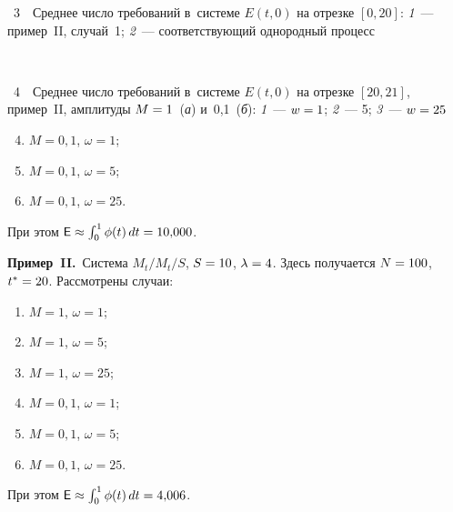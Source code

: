 \begin{multicols}{2}
{\begin{center}
\end{center}

\vspace*{-3pt}


\noindent
{{\figurename~3}\ \ \small{Среднее число требований в~системе $E(t,0)$ на
отрезке $[0,20]$: \textit{1}~--- пример~II, случай~1; \textit{2}~--- 
соответствующий однородный процесс}}

}


\vspace*{9pt}




{ \begin{center}  %
 \vspace*{-2pt}
 \mbox{%
 \epsfxsize=79mm 
 }


\end{center}

\vspace*{-5pt}


\noindent
{{\figurename~4}\ \ \small{Среднее число требований в~системе $E(t,0)$ на
отрезке $[20,21]$, пример~II, амплитуды $M\hm=1$~(\textit{а})
и~0,1~(\textit{б}):
\textit{1}~--- $w\hm=1$; \textit{2}~--- 5; \textit{3}~--- $w\hm=25$}}

}


\vspace*{10pt}




\begin{enumerate}[(1)]
\setcounter{enumi}{3}
\item  $M=0{,}1$, $\omega =1$;
\item  $M=0{,}1$, $\omega =5$;
\item  $M=0{,}1$, $\omega =25$.
\end{enumerate}
При этом $\textsf{E}\hm \approx \int\nolimits_0^1\phi(t)\,dt \hm= 10{,}000$.

\smallskip

\noindent
\textbf{Пример~II.}\ Система $M_t/M_t/S$, $S\hm=10$, $\la\hm=4$. Здесь
получается $N\hm=100$, $t^*\hm=20$. Рассмотрены случаи:
\begin{enumerate}[(1)]
\item  $M=1$, $\omega =1$;
\item  $M=1$, $\omega =5$;
\item  $M=1$, $\omega =25$;
\item  $M=0{,}1$, $\omega =1$;
\item  $M=0{,}1$, $\omega =5$;
\item  $M=0{,}1$, $\omega =25$.
\end{enumerate}
При этом $\textsf{E} \approx \int\nolimits_0^1\phi(t)\,dt \hm= 4{,}006$.


\end{multicols}

